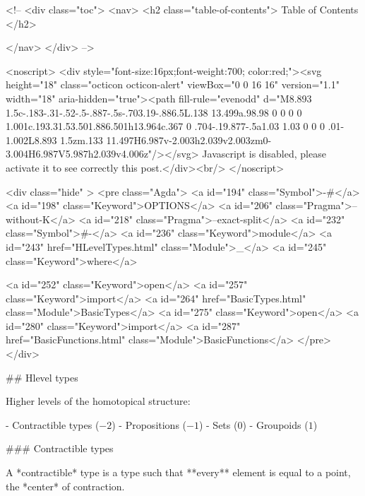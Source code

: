   <!-- 
  <div class="toc">
    <nav>
    <h2 class="table-of-contents"> Table of Contents </h2>
      

    </nav>
  </div>
   -->

  <noscript>
  <div style="font-size:16px;font-weight:700; color:red;"><svg height="18" class="octicon octicon-alert" viewBox="0 0 16 16" version="1.1" width="18" aria-hidden="true"><path fill-rule="evenodd" d="M8.893 1.5c-.183-.31-.52-.5-.887-.5s-.703.19-.886.5L.138 13.499a.98.98 0 0 0 0 1.001c.193.31.53.501.886.501h13.964c.367 0 .704-.19.877-.5a1.03 1.03 0 0 0 .01-1.002L8.893 1.5zm.133 11.497H6.987v-2.003h2.039v2.003zm0-3.004H6.987V5.987h2.039v4.006z"/></svg> Javascript is disabled, please activate it to see correctly this post.</div><br/>
  </noscript>

  <div class="hide" >
<pre class="Agda">
<a id="194" class="Symbol">{-#</a> <a id="198" class="Keyword">OPTIONS</a> <a id="206" class="Pragma">--without-K</a> <a id="218" class="Pragma">--exact-split</a> <a id="232" class="Symbol">#-}</a>
<a id="236" class="Keyword">module</a> <a id="243" href="HLevelTypes.html" class="Module">_</a> <a id="245" class="Keyword">where</a>

<a id="252" class="Keyword">open</a> <a id="257" class="Keyword">import</a> <a id="264" href="BasicTypes.html" class="Module">BasicTypes</a>
<a id="275" class="Keyword">open</a> <a id="280" class="Keyword">import</a> <a id="287" href="BasicFunctions.html" class="Module">BasicFunctions</a>
</pre>
</div>


## Hlevel types

Higher levels of the homotopical structure:

- Contractible types ($-2$)
- Propositions ($-1$)
- Sets ($0$)
- Groupoids ($1$)

### Contractible types

A *contractible* type is a type such that **every**
element is equal to a point, the *center* of contraction.

